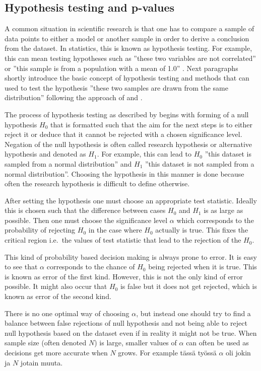 \documentclass[english, oneside]{HYgradu}
\begin{document}
\subsection{Hypothesis testing and p-values}
A common situation in scientific research is that one has to compare a sample of data points to either a model or another sample in order to derive a conclusion from the dataset. In statistics, this is known as hypothesis testing. For example, this can mean testing hypotheses such as ''these two variables are not correlated'' or ''this sample is from a population with a mean of 1.0'' \citep{wall2003practical}. Next paragraphs shortly introduce the basic concept of hypothesis testing and methods that can used to test the hypothesis ''these two samples are drawn from the same distribution'' following the approach of \citep{bohm2010introduction} and \citep{wall2003practical}.

The process of hypothesis testing as described by begins with forming of a null hypothesis $H_0$ that is formatted such that the aim for the next steps is to either reject it or deduce that it cannot be rejected with a chosen significance level. Negation of the null hypothesis is often called research hypothesis or alternative hypothesis and denoted as $H_1$. For example, this can lead to $H_0$ ''this dataset is sampled from a normal distribution'' and $H_1$ ''this dataset is not sampled from a normal distribution''. Choosing the hypothesis in this manner is done because often the research hypothesis is difficult to define otherwise.

After setting the hypothesis one must choose an appropriate test statistic. Ideally this is chosen such that the difference between cases $H_0$ and $H_1$ is as large as possible. Then one must choose 
the significance level $\alpha$ which corresponds to the probability of rejecting $H_0$ in the case where $H_0$ actually is true. This fixes the critical region i.e.\ the values of test statistic that lead to the rejection of the $H_0$. 

This kind of probability based decision making is always prone to error. It is easy to see that $\alpha$ corresponds to the chance of $H_0$ being rejected when it is true. This is known as error of the first kind. However, this is not the only kind of error possible. It might also occur that $H_0$ is false but it does not get rejected, which is known as error of the second kind.

\reversemarginpar
{}
There is no one optimal way of choosing $\alpha$, but instead one should try to find a balance between false rejections of null hypothesis and not being able to reject null hypothesis based on the dataset even if in reality it might not be true. When sample size (often denoted $N$) is large, smaller values of $\alpha$ can often be used as decisions get more accurate when $N$ grows. For example tässä työssä $\alpha$ oli jokin ja $N$ jotain muuta.
\end{document}
